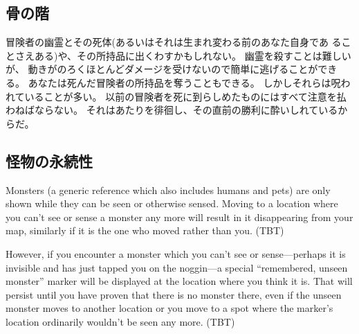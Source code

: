 \subsection*{骨の階}

冒険者の幽霊とその死体(あるいはそれは生まれ変わる前のあなた自身であ
ることさえある)や、その所持品に出くわすかもしれない。
幽霊を殺すことは難しいが、
動きがのろくほとんどダメージを受けないので簡単に逃げることができる。
あなたは死んだ冒険者の所持品を奪うこともできる。
しかしそれらは呪われていることが多い。
以前の冒険者を死に到らしめたものにはすべて注意を払わねばならない。
それはあたりを徘徊し、その直前の勝利に酔いしれているからだ。

\subsection*{怪物の永続性}

Monsters (a generic reference which also includes humans and pets) are only
shown while they can be seen or otherwise sensed.
Moving to a location where you can't see or sense a monster any more
will result in it disappearing from your map, similarly if it is the
one who moved rather than you.
(TBT)

However, if you encounter a monster which you can't see or
sense---perhaps it is invisible and has just tapped you on the
noggin---a special ``remembered, unseen monster'' marker will be displayed at
the location where you think it is.
That will persist until you have
proven that there is no monster there, even if the unseen monster
moves to another location or you move to a spot where the marker's
location ordinarily wouldn't be seen any more.
(TBT)

